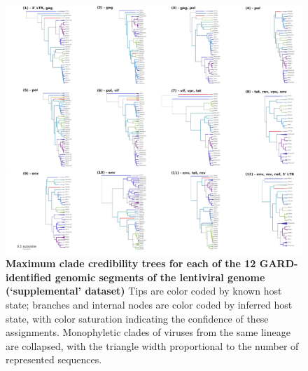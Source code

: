 \begin{figure}[h!]
  \begin{centering}
    \includegraphics[width=\linewidth]{./png/siv_suppdata_trees.png}
  	\caption[Phylogenies of each segment of the lentiviral genome (`supplemental' dataset)]{\textbf{Maximum clade credibility trees for each of the 12 GARD-identified genomic segments of the lentiviral genome (`supplemental' dataset) }
    Tips are color coded by known host state; branches and internal nodes are color coded by inferred host state, with color saturation indicating the confidence of these assignments.
    Monophyletic clades of viruses from the same lineage are collapsed, with the triangle width proportional to the number of represented sequences.
        }
  	\label{siv_suppdata_trees}
  \end{centering}
\end{figure}

